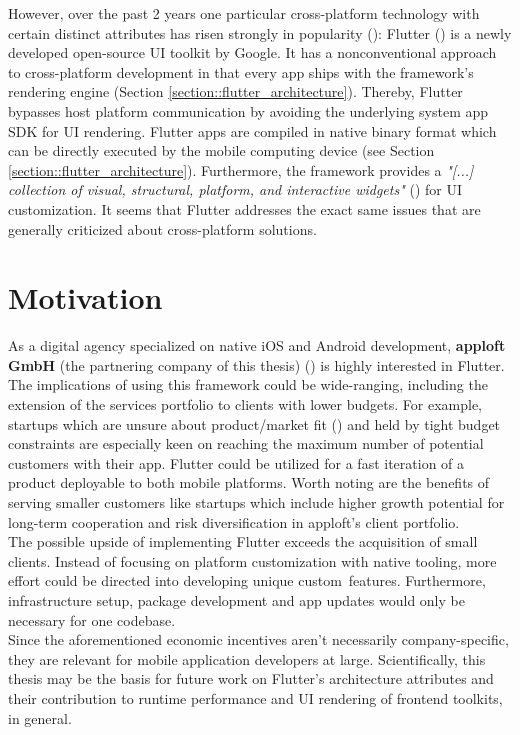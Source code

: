 However, over the past 2 years one particular cross-platform technology with certain distinct attributes has risen strongly in popularity (\cite{Statista2021}):
Flutter (\cite{FlutterDev20}) is a newly developed open-source UI toolkit by Google. 
It has a nonconventional approach to cross-platform development in that every app ships with the framework's rendering engine (Section \ref{section::flutter_architecture}). 
Thereby, Flutter bypasses host platform communication by avoiding the underlying system app SDK for UI rendering.
Flutter apps are compiled in native binary format which can be directly executed by the mobile computing device (see Section \ref{section::flutter_architecture}).
Furthermore, the framework provides a \textit{"[...] collection of visual, structural, platform, and interactive widgets"} (\textcite{GoogleWidgets2021}) for UI customization.
It seems that Flutter addresses the exact same issues that are generally criticized about cross-platform solutions.

\section{Motivation}
\label{section:motivation}
As a digital agency specialized on native iOS and Android development, \textbf{apploft GmbH} 
(the partnering company of this thesis) (\cite{apploft2021}) is highly interested in Flutter. 
The implications of using this framework could be wide-ranging, including the extension of the services portfolio
to clients with lower budgets.
For example, startups which are unsure about product/market fit (\cite{Andreesen2007}) and held by tight budget constraints are especially keen on reaching 
the maximum number of potential customers with their app. Flutter could be utilized for a fast iteration of a product deployable to 
both mobile platforms. 
Worth noting are the benefits of serving smaller customers like startups which include higher growth potential for long-term cooperation
and risk diversification in apploft's client portfolio.\\
The possible upside of implementing Flutter exceeds the acquisition of small clients. Instead of focusing on platform customization with native tooling, more effort could 
be directed into developing unique custom features.
Furthermore, infrastructure setup, package development and app updates would only be necessary for one codebase.\\
Since the aforementioned economic incentives aren't necessarily company-specific, they are relevant for mobile application developers at large.
Scientifically, this thesis may be the basis for future work on Flutter's architecture attributes and their contribution to runtime performance and UI rendering of frontend toolkits, in general.

